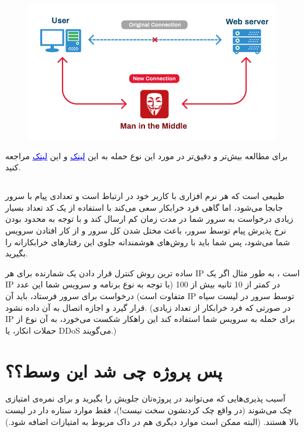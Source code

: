 \documentclass[]{article}
\begin{document}
\begin{figure}
  \includegraphics[width=\linewidth]{images/man-in-the-middle.png}
\end{figure}
\bigskip

برای مطالعه بیش‌تر و دقیق‌تر در مورد این نوع حمله به این \href{https://www.imperva.com/learn/application-security/man-in-the-middle-attack-mitm/}{\textcolor{blue}{\underline{لینک}}}
 و این \href{https://en.wikipedia.org/wiki/Man-in-the-middle_attack}{\textcolor{blue}{\underline{لینک}}} مراجعه کنید.





\subsection*{{}}
طبیعی است که هر نرم افزاری با کاربر خود در ارتباط است و تعدادی پیام با سرور جابجا می‌شود، اما گاهی فرد خرابکار سعی می‌کند با استفاده از یک کد تعداد بسیار زیادی درخواست به سرور شما در مدت زمان کم ارسال کند و با توجه به محدود بودن نرخ پذیرش پیام توسط سرور‌، باعث مختل شدن کل سرور و از کار افتادن سرویس شما می‌شود، پس شما باید با روش‌های هوشمندانه جلوی این رفتارهای خرابکارانه را بگیرید.
\bigskip

ساده ترین روش کنترل قرار دادن یک شمارنده برای هر IP است ، به طور مثال اگر یک IP در کمتر از 10 ثانیه بیش از 100 (با توجه به نوع برنامه و سرویس شما این عدد متفاوت است) درخواست برای سرور فرستاد، باید آن IP توسط سرور در لیست سیاه قرار گیرد و اجازه اتصال به آن داده نشود. (در صورتی که فرد خرابکار از تعداد زیادی IP برای حمله به سرویس شما استفاده کند این راهکار شکست می‌خورد، به آن نوع از حملات انکار،  یا DDoS می‌گویند.)

\section*{{\titr پس پروژه چی شد این وسط؟؟}}
آسیب پذیری‌هایی که می‌توانید در پروژه‌تان جلویش را بگیرید و برای نمره‌ی امتیازی چک می‌شوند (در واقع چک کردنشون سخت نیست!‌)، فقط موارد ستاره دار در لیست بالا هستند. (‌البته ممکن است موارد دیگری هم در داک مربوط به امتیازات اضافه شود.)
\end{document}
